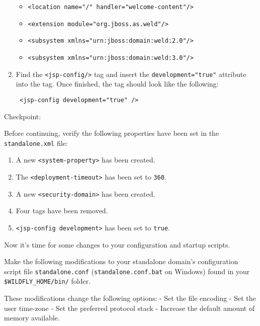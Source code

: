 \begin{enumerate}
  \begin{itemize}
  \tightlist
  \item
    \texttt{\textless{}location\ name="/"\ handler="welcome-content"/\textgreater{}}
  \item
    \texttt{\textless{}extension\ module="org.jboss.as.weld"/\textgreater{}}
  \item
    \texttt{\textless{}subsystem\ xmlns="urn:jboss:domain:weld:2.0"/\textgreater{}}
  \item
    \texttt{\textless{}subsystem\ xmlns="urn:jboss:domain:weld:3.0"/\textgreater{}}
  \end{itemize}
\item
  Find the \texttt{\textless{}jsp-config/\textgreater{}} tag and insert
  the \texttt{development="true"} attribute into the tag. Once finished,
  the tag should look like the following:

\begin{verbatim}
 <jsp-config development="true" />
\end{verbatim}
\end{enumerate}

Checkpoint:

Before continuing, verify the following properties have been set in the
\texttt{standalone.xml} file:

\begin{enumerate}
\def\labelenumi{\arabic{enumi}.}
\item
  A new \texttt{\textless{}system-property\textgreater{}} has been
  created.
\item
  The \texttt{\textless{}deployment-timeout\textgreater{}} has been set
  to \texttt{360}.
\item
  A new \texttt{\textless{}security-domain\textgreater{}} has been
  created.
\item
  Four tags have been removed.
\item
  \texttt{\textless{}jsp-config\ development\textgreater{}} has been set
  to \texttt{true}.
\end{enumerate}

Now it's time for some changes to your configuration and startup
scripts.

Make the following modifications to your standalone domain's
configuration script file \texttt{standalone.conf}
(\texttt{standalone.conf.bat} on Windows) found in your
\texttt{\$WILDFLY\_HOME/bin/} folder.

These modifications change the following options: - Set the file
encoding - Set the user time-zone - Set the preferred protocol stack -
Increase the default amount of memory available.

